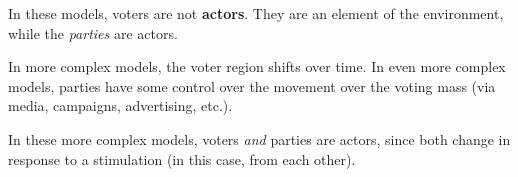 \documentclass[titlepage, 12pt, leqno]{article}
\begin{document}
\begin{note}
    In these models, voters are not \textbf{actors}. They are an element of the
    environment, while the \textit{parties} are actors.
\end{note}

In more complex models, the voter region shifts over time. In even more complex 
models, parties have some control over the movement over the voting mass (via
media, campaigns, advertising, etc.). 

\begin{note}
    In these more complex models, voters \textit{and} parties are actors, since
    both change in response to a stimulation (in this case, from each other).
\end{note}
\end{document}
